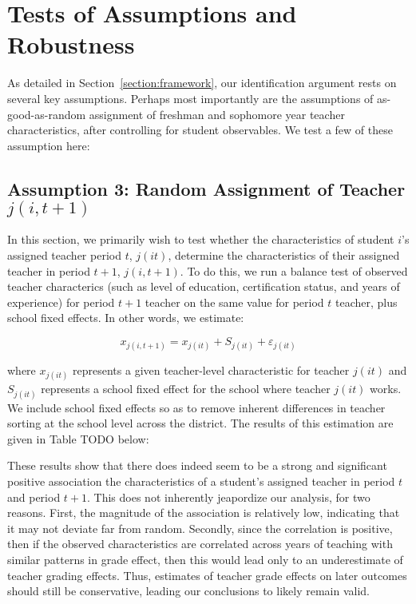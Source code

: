 \documentclass[../thesis_main.tex]{subfiles}
\begin{document}
\doublespacing
\section{Tests of Assumptions and Robustness}
\label{section:tests}

As detailed in Section~\ref{section:framework}, our identification argument rests on several key assumptions. Perhaps most importantly are the assumptions of as-good-as-random assignment of freshman and sophomore year teacher characteristics, after controlling for student observables. We test a few of these assumption here:

\subsection{Assumption 3: Random Assignment of Teacher $j(i,t+1)$}

In this section, we primarily wish to test whether the characteristics of student $i$'s assigned teacher period $t$, $j(it)$, determine the characteristics of their assigned teacher in period $t+1$, $j(i,t+1)$. To do this, we run a balance test of observed teacher characterics (such as level of education, certification status, and years of experience) for period $t+1$ teacher on the same value for period $t$ teacher, plus school fixed effects. In other words, we estimate:

\begin{equation}
	x_{j(i,t+1)} = x_{j(it)} + S_{j(it)} + \varepsilon_{j(it)}
\end{equation}

where $x_{j(it)}$ represents a given teacher-level characteristic for teacher $j(it)$ and $S_{j(it)}$ represents a school fixed effect for the school where teacher $j(it)$ works. We include school fixed effects so as to remove inherent differences in teacher sorting at the school level across the district. The results of this estimation are given in Table TODO below:

These results show that there does indeed seem to be a strong and significant positive association the characteristics of a student's assigned teacher in period $t$ and period $t+1$. This does not inherently jeapordize our analysis, for two reasons. First, the magnitude of the association is relatively low, indicating that it may not deviate far from random. Secondly, since the correlation is positive, then if the observed characteristics are correlated across years of teaching with similar patterns in grade effect, then this would lead only to an underestimate of teacher grading effects. Thus, estimates of teacher grade effects on later outcomes should still be conservative, leading our conclusions to likely remain valid. 
\end{document}
